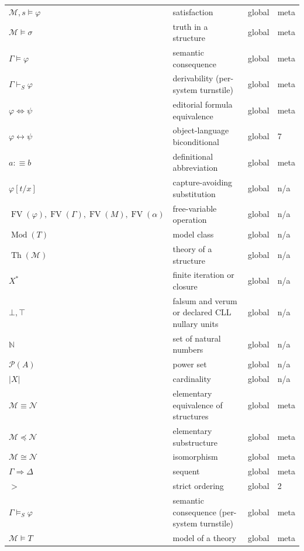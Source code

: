 \begin{longtable}{@{}p{}p{}p{}p{}@{}}
\(\mathcal M,\allowbreak s\models\varphi\) & satisfaction & global & meta \\
\(\mathcal M\models\sigma\) & truth in a structure & global & meta \\
\(\Gamma\models\varphi\) & semantic consequence & global & meta \\
\(\Gamma\vdash_{S}\varphi\) & derivability (per-system turnstile) & global & meta \\
\(\varphi\Leftrightarrow\psi\) & editorial formula equivalence & global & meta \\
\(\varphi\leftrightarrow\psi\) & object-language biconditional & global & 7 \\
\(a\mathrel{:\equiv}b\) & definitional abbreviation & global & meta \\
\(\varphi[t/x]\) & capture-avoiding substitution & global & n/a \\
\(\operatorname{FV}(\varphi),\allowbreak \operatorname{FV}(\Gamma),\allowbreak \operatorname{FV}(M),\allowbreak \operatorname{FV}(\alpha)\) & free-variable operation & global & n/a \\
\(\operatorname{Mod}(T)\) & model class & global & n/a \\
\(\operatorname{Th}(\mathcal M)\) & theory of a structure & global & n/a \\
\(X^*\) & finite iteration or closure & global & n/a \\
\(\bot,\allowbreak \top\) & falsum and verum or declared CLL nullary units & global & n/a \\
\(\mathbb N\) & set of natural numbers & global & n/a \\
\(\mathcal P(A)\) & power set & global & n/a \\
\(|X|\) & cardinality & global & n/a \\
\(\mathcal M\equiv\mathcal N\) & elementary equivalence of structures & global & meta \\
\(\mathcal M\preccurlyeq\mathcal N\) & elementary substructure & global & meta \\
\(\mathcal M\cong\mathcal N\) & isomorphism & global & meta \\
\(\Gamma\Rightarrow\Delta\) & sequent & global & meta \\
\(>\) & strict ordering & global & 2 \\
\(\Gamma\models_{S}\varphi\) & semantic consequence (per-system turnstile) & global & meta \\
\(\mathcal M\models T\) & model of a theory & global & meta \\

\end{longtable}

